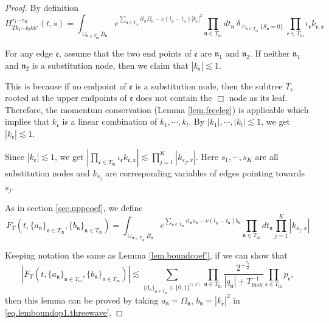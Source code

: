 \begin{proof} By definition
\begin{equation}
H^{\tau_1\cdots \tau_{K}}_{Tk_1\cdots k_{l}kk'}(t,s)=\int_{\cup_{\mathfrak{n}\in T_{\text{in}}} B_{\mathfrak{n}}} e^{\sum_{\mathfrak{n}\in T_{\text{in}}} it_{\mathfrak{n}}\Omega_{\mathfrak{n}}-\nu(t_{\widehat{\mathfrak{n}}}-t_{\mathfrak{n}})|k_{\mathfrak{e}}|^2}  %
\prod_{\mathfrak{n}\in T_{\text{in}}} dt_{\mathfrak{n}} 
\ \delta_{\cap_{\mathfrak{n}\in T_{\text{in}}} \{S_{\mathfrak{n}}=0\}}\ \prod_{\mathfrak{e}\in T_{\text{in}}}\iota_{\mathfrak{e}}k_{\mathfrak{e},x}
\end{equation}

For any edge $\mathfrak{e}$, assume that the two end points of $\mathfrak{e}$ are $\mathfrak{n}_1$ and $\mathfrak{n}_2$. If neither $\mathfrak{n}_1$ and $\mathfrak{n}_2$ is a substitution node, then we claim that $|k_{\mathfrak{e}}|\lesssim 1$. 

This is because if no endpoint of $\mathfrak{e}$ is a substitution node, then the subtree $T_{\mathfrak{e}}$ rooted at the upper endpoints of $\mathfrak{e}$ does not contain the $\Box$ node as its leaf. Therefore, the momentum conservation (Lemma \ref{lem.freeleg}) is applicable which implies that $k_{\mathfrak{e}}$ is a linear combination of $k_1,\cdots,k_{l}$. By $|k_1|, \cdots, |k_{l}|\lesssim 1$, we get $|k_{\mathfrak{e}}|\lesssim 1$. 

Since $|k_{\mathfrak{e}}|\lesssim 1$, we get $\left|\prod_{\mathfrak{e}\in T_{\text{in}}}\iota_{\mathfrak{e}}k_{\mathfrak{e},x}\right|\lesssim \prod^K_{j=1}|k_{s_j,x}|$. Here $s_1, \cdots, s_K$ are all substitution nodes and $k_{s_j}$ are corresponding variables of edges pointing towards $s_j$.


As in section \ref{sec.uppcoef}, we define 
\begin{equation}\label{eq.defF_Toperator.threewave}
F_{T}(t,\{a_{\mathfrak{n}}\}_{\mathfrak{n}\in T_{\text{in}}},\{b_{\mathfrak{n}}\}_{\mathfrak{n}\in T_{\text{in}}})=\int_{\cup_{\mathfrak{n}\in T_{\text{in}}} B_{\mathfrak{n}}} e^{\sum_{\mathfrak{n}\in T_{\text{in}}} it_{\mathfrak{n}} a_{\mathfrak{n}} - \nu(t_{\widehat{\mathfrak{n}}}-t_{\mathfrak{n}})b_{\mathfrak{n}}} \prod_{\mathfrak{n}\in T_{\text{in}}} dt_{\mathfrak{n}} \prod^K_{j=1}|k_{s_j,x}|
\end{equation}

Keeping notation the same as Lemma \ref{lem.boundcoef'}, if we can show that
\begin{equation}\label{eq.lemboundop1.threewave}
    |F_{T}(t,\{a_{\mathfrak{n}}\}_{\mathfrak{n}\in T_{\text{in}}},\{b_{\mathfrak{n}}\}_{\mathfrak{n}\in T_{\text{in}}})|\lesssim\sum_{\{d_{\mathfrak{n}}\}_{\mathfrak{n}\in T_{\text{in}}}\in\{0,1\}^{l(T)}}\prod_{\mathfrak{n}\in T_{\text{in}}}\frac{2^{-\frac{\tau_{\mathfrak{n}}}{2}}}{|q_{\mathfrak{n}}|+T^{-1}_{\text{max}}}\prod_{\mathfrak{e}\in T_{\text{in}}} p_{\mathfrak{e}}
,
\end{equation}
then this lemma can be proved by taking $a_{\mathfrak{n}}=\Omega_{\mathfrak{n}}$, $b_{\mathfrak{n}}=|k_{\mathfrak{e}}|^2$ in \eqref{eq.lemboundop1.threewave}.


\end{proof}
